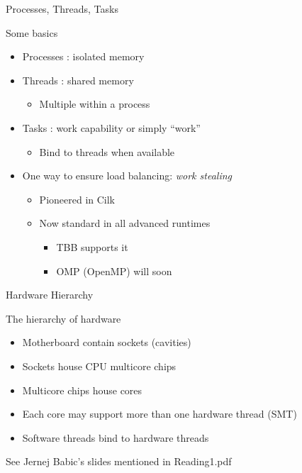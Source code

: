\documentclass{beamer}
\begin{document}
\begin{frame}{Processes, Threads, Tasks}

\noindent Some basics
\begin{itemize}
\item Processes : isolated memory
\item Threads : shared memory
  \begin{itemize}
  \item Multiple within a process
  \end{itemize}
\item Tasks : work capability or simply ``work''
  \begin{itemize}
  \item Bind to threads when available
  \end{itemize}
\item One way to ensure load balancing: {\em work stealing}
  \begin{itemize}
  \item Pioneered in Cilk
  \item Now standard in all advanced runtimes
    \begin{itemize}
    \item TBB supports it
    \item OMP (OpenMP) will soon
    \end{itemize}
  \end{itemize}
\end{itemize}
 
\end{frame}



\begin{frame}{Hardware Hierarchy}

\noindent The hierarchy of hardware
\begin{itemize}
\item Motherboard contain sockets (cavities)
\item Sockets house CPU multicore chips 
\item Multicore chips house cores
\item Each core may support more than one hardware thread
  (SMT)
\item Software threads bind to hardware threads
\end{itemize}

\noindent See Jernej Babic's slides mentioned in Reading1.pdf
 
\end{frame}
\end{document}
